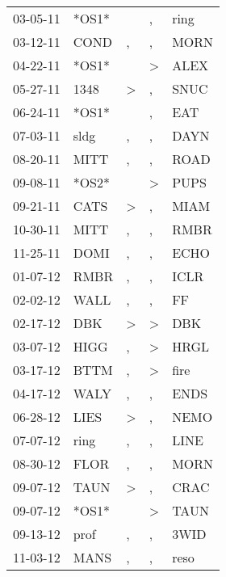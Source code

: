 \begin{supertabular}{lllll}
 03-05-11 &  *OS1* &                  &                , &   ring \\
 03-12-11 &   COND &                , &                , &   MORN \\
 04-22-11 &  *OS1* &                  &     \textgreater &   ALEX \\
 05-27-11 &   1348 &     \textgreater &                , &   SNUC \\
 06-24-11 &  *OS1* &                  &                , &    EAT \\
 07-03-11 &   sldg &                , &                , &   DAYN \\
 08-20-11 &   MITT &                , &                , &   ROAD \\
 09-08-11 &  *OS2* &                  &     \textgreater &   PUPS \\
 09-21-11 &   CATS &     \textgreater &                , &   MIAM \\
 10-30-11 &   MITT &                , &                , &   RMBR \\
 11-25-11 &   DOMI &                , &                , &   ECHO \\
 01-07-12 &   RMBR &                , &                , &   ICLR \\
 02-02-12 &   WALL &                , &                , &     FF \\
 02-17-12 &    DBK &     \textgreater &     \textgreater &    DBK \\
 03-07-12 &   HIGG &                , &     \textgreater &   HRGL \\
 03-17-12 &   BTTM &                , &     \textgreater &   fire \\
 04-17-12 &   WALY &                , &                , &   ENDS \\
 06-28-12 &   LIES &     \textgreater &                , &   NEMO \\
 07-07-12 &   ring &                , &                , &   LINE \\
 08-30-12 &   FLOR &                , &                , &   MORN \\
 09-07-12 &   TAUN &     \textgreater &                , &   CRAC \\
 09-07-12 &  *OS1* &                  &     \textgreater &   TAUN \\
 09-13-12 &   prof &                , &                , &   3WID \\
 11-03-12 &   MANS &                , &                , &   reso \\

\end{supertabular}
